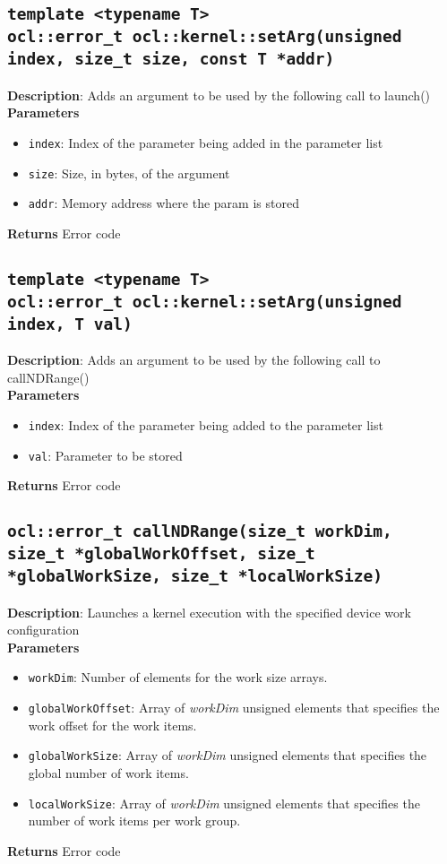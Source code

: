 \subsection{\texttt{template <typename T>\\ocl::error\_t ocl::kernel::setArg(unsigned index, size\_t 
size, const T *addr)}}

\textbf{Description}: Adds an argument to be used by the following call to launch()\\
\textbf{Parameters}
\begin{itemize}
  \item \texttt{index}: Index of the parameter being added in the parameter list
  \item \texttt{size}: Size, in bytes, of the argument
  \item \texttt{addr}: Memory address where the param is stored
\end{itemize}
\textbf{Returns} Error code

\subsection{\texttt{template <typename T>\\ocl::error\_t ocl::kernel::setArg(unsigned index, T 
val)}}

\textbf{Description}: Adds an argument to be used by the following call to callNDRange()\\
\textbf{Parameters}
\begin{itemize}
  \item \texttt{index}: Index of the parameter being added to the parameter list
  \item \texttt{val}: Parameter to be stored
\end{itemize}
\textbf{Returns} Error code

\subsection{\texttt{ocl::error\_t callNDRange(size\_t workDim, size\_t *globalWorkOffset, size\_t 
*globalWorkSize, size\_t *localWorkSize)}}

\textbf{Description}: Launches a kernel execution with the specified device work configuration\\
\textbf{Parameters}
\begin{itemize}
  \item \texttt{workDim}: Number of elements for the work size arrays.
  \item \texttt{globalWorkOffset}: Array of \emph{workDim} unsigned elements that specifies the work 
  offset for the work items.
  \item \texttt{globalWorkSize}: Array of \emph{workDim} unsigned elements that specifies the global 
  number of work items.
  \item \texttt{localWorkSize}: Array of \emph{workDim} unsigned elements that specifies the number 
of work items per work group.
\end{itemize}
\textbf{Returns} Error code



